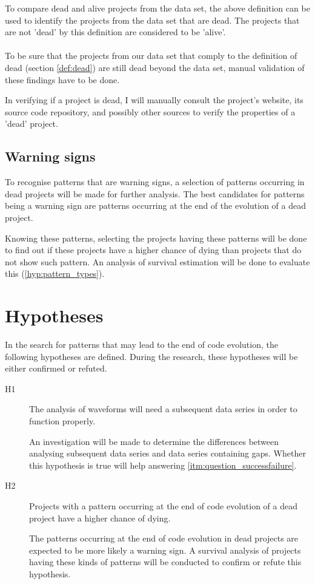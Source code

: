 To compare dead and alive projects from the data set, the above definition can
be used to identify the projects from the data set that are dead. The projects
that are not 'dead' by this definition are considered to be 'alive'.

\paragraph{}
To be sure that the projects from our data set that comply to the definition of
dead (section \ref{def:dead}) are still dead beyond the data set, manual
validation of these findings have to be done.

In verifying if a project is dead, I will manually consult the project's
website, its source code repository, and possibly other sources to verify the
properties of a 'dead' project.

\subsection{Warning signs}
To recognise patterns that are warning signs, a selection of patterns occurring
in dead projects will be made for further analysis. The best candidates for
patterns being a warning sign are patterns occurring at the end of the
evolution of a dead project.

Knowing these patterns, selecting the projects having these patterns will be
done to find out if these projects have a higher chance of dying than projects
that do not show such pattern. An analysis of survival estimation will be done
to evaluate this (\ref{hyp:pattern_types}).

\section{Hypotheses}
In the search for patterns that may lead to the end of code evolution, the
following hypotheses are defined. During the research, these hypotheses will be
either confirmed or refuted.

\begin{description}
	\item[H1\label{hyp:subsequent_data}] \hspace{0em}
	The analysis of waveforms will need a subsequent data series in order
	to function properly.

	An investigation will be made to determine the differences between analysing
	subsequent data series and data series containing gaps. Whether this
	hypothesis is true will help answering \ref{itm:question_successfailure}.
	
	\item[H2\label{hyp:pattern_types}] \hspace{0em}
	Projects with a pattern occurring at the end of code evolution of a dead
	project have a higher chance of dying.

	The patterns occurring at the end of code evolution in dead projects are
	expected to be more likely a warning sign. A survival analysis of projects
	having these kinds of patterns will be conducted to confirm or refute this
	hypothesis.
\end{description}


